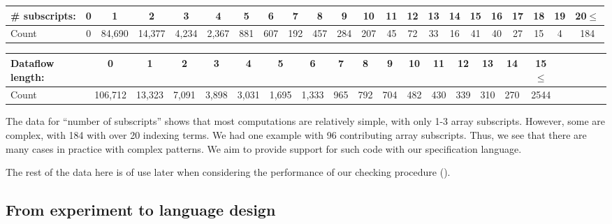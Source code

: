    \begin{center}     \begin{tabular}{l|ccccccccccccccccccccc}
   \textbf{\# subscripts}: & 0 & 1     & 2     & 3    &
                                                                       4
     & 5   & 6   & 7   & 8   & 9   & 10  & 11 & 12 & 13 & 14 & 15 & 16
     & 17 & 18 & 19 & 20$\leq$ \\\hline
   Count & 0 & 84,690 & 14,377 & 4,234 & 2,367 & 881 & 607 & 192 & 457 & 284 & 207 & 45 & 72 & 33 & 16 & 41 & 40 & 27 & 15 & 4  & 184
   \end{tabular}
\end{center}

 \begin{center}
\begin{tabular}{l|ccccccccccccccccccccc}
  \textbf{Dataflow length}: & 0      & 1     & 2    & 3
  & 4    & 5 & 6    & 7   & 8   & 9   & 10  & 11  & 12  & 13  & 14
  & 15$\leq$ \\\hline
  Count & 106,712 & 13,323 & 7,091 & 3,898 & 3,031 & 1,695 & 1,333 & 965 & 792 & 704 & 482 & 430 & 339 & 310 & 270 & 2544
\end{tabular}
\end{center}
%
The data for ``number of subscripts'' shows that most computations are
relatively simple, with only 1-3 array subscripts.  However, some are
complex, with 184 with over 20 indexing terms. We had one example with
96 contributing array subscripts. Thus, we see that there are many
cases in practice with complex patterns. We aim to provide
support for such code with our specification language.

The rest of the data here is of use later when considering the
performance of our checking procedure ().

\subsection{From experiment to language design}
\label{subsec:choices}

